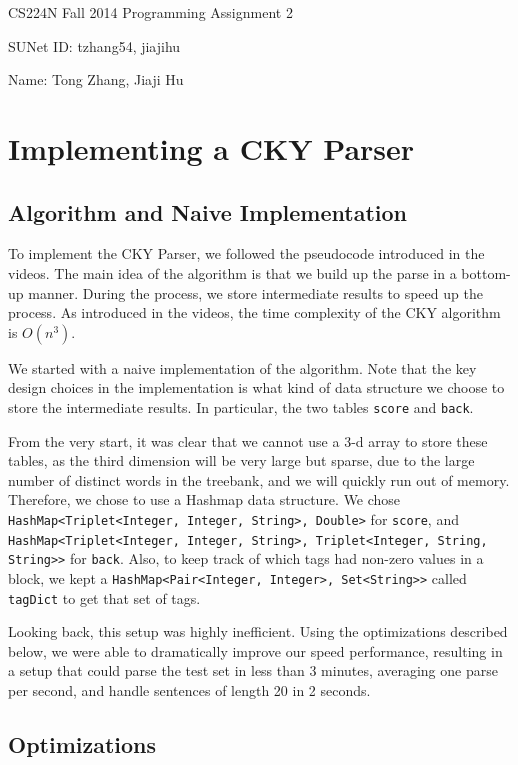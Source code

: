 \documentclass[12pt]{article}
\begin{document}
\begin{center}
{\Large CS224N Fall 2014 Programming Assignment 2}
\vspace{12pt}

SUNet ID: tzhang54, jiajihu

Name: Tong Zhang, Jiaji Hu
\vspace{12pt}
\end{center}

\section{Implementing a CKY Parser}
\subsection{Algorithm and Naive Implementation}
To implement the CKY Parser, we followed the pseudocode introduced in the videos. The main idea of the algorithm is that we build up the parse in a bottom-up manner. During the process, we store intermediate results to speed up the process.
As introduced in the videos, the time complexity of the CKY algorithm is $O(n^3)$.

We started with a naive implementation of the algorithm. Note that the key design choices in the implementation is what kind of data structure we choose to store the intermediate results. In particular, the two tables \texttt{score} and \texttt{back}.

From the very start, it was clear that we cannot use a 3-d array to store these tables, as the third dimension will be very large but sparse, due to the large number of distinct words in the treebank, and we will quickly run out of memory. Therefore, we chose to use a Hashmap data structure. We chose \texttt{HashMap<Triplet<Integer, Integer, String>, Double>} for \texttt{score}, and \texttt{HashMap<Triplet<Integer, Integer, String>, Triplet<Integer, String, String>>} for \texttt{back}. Also, to keep track of which tags had non-zero values in a block, we kept a \texttt{HashMap<Pair<Integer, Integer>, Set<String>>} called \texttt{tagDict} to get that set of tags.

Looking back, this setup was highly inefficient. Using the optimizations described below, we were able to dramatically improve our speed performance, resulting in a setup that could parse the test set in less than 3 minutes, averaging one parse per second, and handle sentences of length 20 in 2 seconds.
\subsection{Optimizations}
\end{document}
